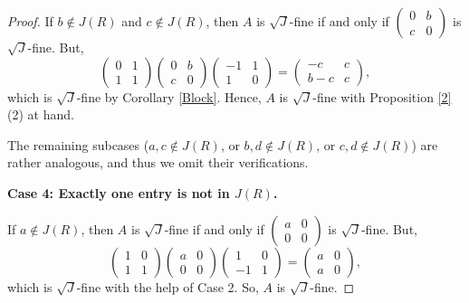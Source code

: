 \documentclass[12pt]{amsart}
\theoremstyle{definition}
\begin{document}
\begin{proof}
If \( b \not\in J(R) \) and \( c \not\in J(R) \), then \( A \) is $\sqrt{J}$-fine if and only if \( \begin{pmatrix} 0 & b \\ c & 0 \end{pmatrix} \) is $\sqrt{J}$-fine. But,
	\[
	\begin{pmatrix} 0 & 1 \\ 1 & 1 \end{pmatrix} \begin{pmatrix} 0 & b \\ c & 0 \end{pmatrix} \begin{pmatrix} -1 & 1 \\ 1 & 0 \end{pmatrix}
	= \begin{pmatrix} -c & c \\ b-c & c \end{pmatrix},
	\]
which is $\sqrt{J}$-fine by Corollary \ref{Block}. Hence, \( A \) is $\sqrt{J}$-fine with Proposition \ref{2}(2) at hand.
	
The remaining subcases (\( a,c \not\in J(R) \), or \( b,d \not\in J(R) \), or \( c,d \not\in J(R) \)) are rather analogous, and thus we omit their verifications.

\medskip
	
\textbf{Case 4: Exactly one entry is not in \( J(R) \).}

\medskip
	
If \( a \not\in J(R) \), then \( A \) is $\sqrt{J}$-fine if and only if \( \begin{pmatrix} a & 0 \\ 0 & 0 \end{pmatrix} \) is $\sqrt{J}$-fine. But,
	\[
	\begin{pmatrix} 1 & 0 \\ 1 & 1 \end{pmatrix} \begin{pmatrix} a & 0 \\ 0 & 0 \end{pmatrix} \begin{pmatrix} 1 & 0 \\ -1 & 1 \end{pmatrix}
	= \begin{pmatrix} a & 0 \\ a & 0 \end{pmatrix},
	\]
which is $\sqrt{J}$-fine with the help of Case 2. So, \( A \) is $\sqrt{J}$-fine.
	

\end{proof}
\end{document}
